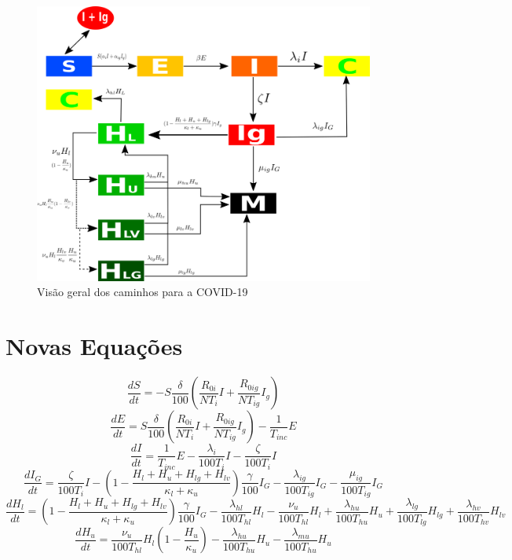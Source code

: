 \documentclass{article}
\begin{document}
\begin{figure}[!h]
	\centering
	\includegraphics[scale=0.4]{covid}
	\caption{Visão geral dos caminhos para a COVID-19}
	\label{fig:universe}
\end{figure}

\section{Novas Equações}

\begin{equation}
	\frac{dS}{dt}= -S\frac{\delta}{100}(\frac{R_{0i}}{N T_{i}} I +\frac{R_{0ig}}{N T_{ig}}I_g)
\end{equation}
\begin{equation}
	\frac{dE}{dt}= S\frac{\delta}{100}(\frac{R_{0i}}{N T_{i}} I +\frac{R_{0ig}}{N T_{ig}}I_g) - \frac{1}{T_{inc}} E
\end{equation}
\begin{equation}
	\frac{dI}{dt}= \frac{1}{T_{inc}} E -\frac{\lambda_i}{100T_{i}} I - \frac{\zeta}{100T_{i}} I
\end{equation}
\begin{equation}
	\frac{dI_G}{dt}=  \frac{\zeta}{100T_{i}} I -(1-\frac{H_l+H_u+H_{lg}+H_{lv}}{\kappa_l+\kappa_u})\frac{\gamma}{100} I_G - \frac{\lambda_{ig}}{100 T_{ig}} I_G - \frac{\mu_{ig}}{100 T_{ig}} I_G
\end{equation}
\begin{equation}
	\frac{dH_l}{dt}=(1-\frac{H_l+H_u+H_{lg}+H_{lv}}{\kappa_l+\kappa_u})\frac{\gamma}{100} I_G - \frac{\lambda_{hl}}{100T_{hl}} H_l - \frac{\nu_u}{100T_{hl}}H_l+ \frac{\lambda_{hu}}{100T_{hu}}H_u +\frac{\lambda_{lg}}{100T_{lg}}H_{lg} +\frac{\lambda_{hv}}{100T_{hv}}H_{lv}
\end{equation}
\begin{equation}
	\frac{dH_u}{dt}=\frac{\nu_u}{100T_{hl}} H_l(1 - \frac{H_u}{\kappa_{u}}) -\frac{\lambda_{hu}}{100T_{hu}}H_u -\frac{\lambda_{mu}}{100T_{hu}}H_u
\end{equation}
\end{document}
